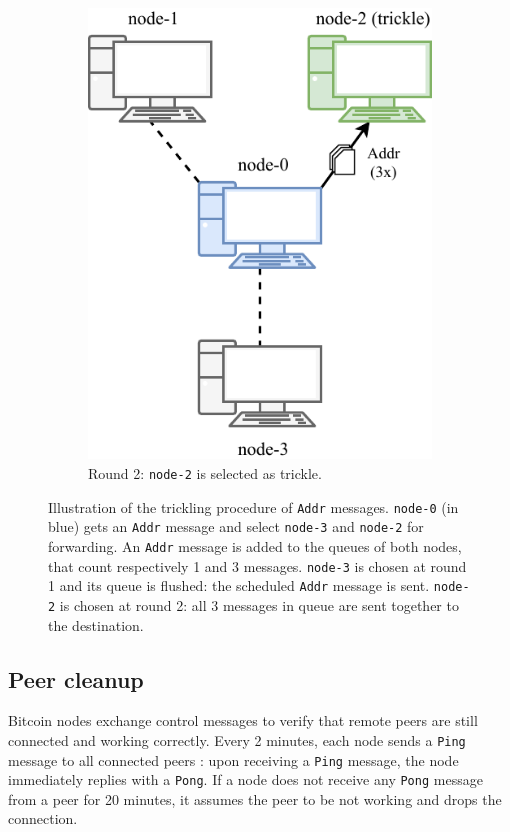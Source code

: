 \begin{figure}[ht!]
\begin{subfigure}{.42\textwidth}
		\includegraphics[width=\columnwidth]{figures/trickling_2}
		\vspace*{0.1cm}
		\caption{
			Round \num{2}:
			\texttt{node-2} is selected as trickle.
		}
		\vspace*{0.2cm}
	\end{subfigure}
	\caption[Illustration of the trickling procedure]{
		Illustration of the trickling procedure of \texttt{Addr} messages.
		\texttt{node-0} (in blue) gets an \texttt{Addr} message and select \texttt{node-3} and \texttt{node-2} for forwarding.
		An \texttt{Addr} message is added to the queues of both nodes, that count respectively \num{1} and \num{3} messages.
		\texttt{node-3} is chosen at round \num{1} and its queue is flushed:
		the scheduled \texttt{Addr} message is sent.
		\texttt{node-2} is chosen at round \num{2}:
		all \num{3} messages in queue are sent together to the destination.
	}
	\label{fig:trickling}
\end{figure}

\subsection{Peer cleanup}
Bitcoin nodes exchange control messages to verify that remote peers are still connected and working correctly.
Every \num{2} minutes, each node sends a \texttt{Ping} message to all connected peers \cite{bitcoin_ping_pong}:
upon receiving a \texttt{Ping} message, the node immediately replies with a \texttt{Pong}.
If a node does not receive any \texttt{Pong} message from a peer for \num{20} minutes, it assumes the peer to be not working and drops the connection.


